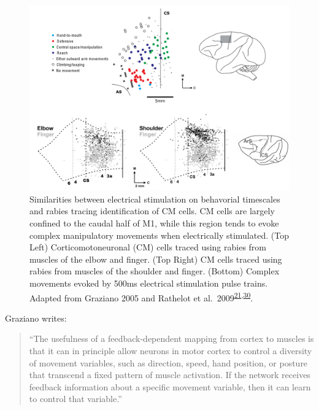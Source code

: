 \documentclass[
  a4paper,
]{article}
\begin{document}
\begin{figure}
\hypertarget{fig:strick_graziano}{%
\centering
\includegraphics[width=1\textwidth,height=\textheight]{images/physiology/strick_graziano/strick_graziano.pdf}
\caption{Similarities between electrical stimulation on behavorial
timescales and rabies tracing identification of CM cells. CM cells are
largely confined to the caudal half of M1, while this region tends to
evoke complex manipulatory movements when electrically stimulated. (Top
Left) Corticomotoneuronal (CM) cells traced using rabies from muscles of
the elbow and finger. (Top Right) CM cells traced using rabies from
muscles of the shoulder and finger. (Bottom) Complex movements evoked by
500ms electrical stimulation pulse trains. Adapted from Graziano 2005
and Rathelot et
al.~2009\textsuperscript{\protect\hyperlink{ref-Rathelot2009}{21},\protect\hyperlink{ref-graziano2005}{30}}.}\label{fig:strick_graziano}
}
\end{figure}

Graziano writes:

\begin{quote}
``The usefulness of a feedback-dependent mapping from cortex to muscles
is that it can in principle allow neurons in motor cortex to control a
diversity of movement variables, such as direction, speed, hand
position, or posture that transcend a fixed pattern of muscle
activation. If the network receives feedback information about a
specific movement variable, then it can learn to control that
variable.''
\end{quote}
\end{document}
